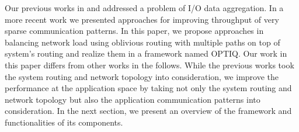 Our previous works in \cite{Vishwanath:GLEAN} and \cite{SDAV:Bui2014b} addressed a problem of I/O data aggregation. In a more recent work \cite{hbui:bgq} we presented approaches for improving throughput of very sparse communication patterns. In this paper, we propose approaches in balancing network load using oblivious routing with multiple paths on top of system's routing and realize them in a framework named OPTIQ. Our work in this paper differs from other works in the follows. While the previous works took the system routing and network topology into consideration, we improve the performance at the application space by taking not only the system routing and network topology but also the application communication patterns into consideration. In the next section, we present an overview of the framework and functionalities of its components.
